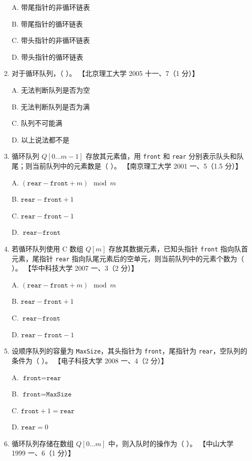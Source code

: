 \documentclass[lang=cn,newtx,10pt,scheme=chinese]{elegantbook}
\begin{document}
\begin{enumerate}
    A. 带尾指针的非循环链表  

    B. 带尾指针的循环链表  

    C. 带头指针的非循环链表  

    D. 带头指针的循环链表  

    \item 对于循环队列，（ ）。  
    【北京理工大学 2005 十一、7（1 分）】  

    A. 无法判断队列是否为空  

    B. 无法判断队列是否为满  

    C. 队列不可能满  

    D. 以上说法都不是  

    \item 循环队列 $Q[0 \ldots m-1]$ 存放其元素值，用 \texttt{front} 和 \texttt{rear} 分别表示队头和队尾；则当前队列中的元素数是（ ）。  
    【南京理工大学 2001 一、5（1.5 分）】  

    A. $(\texttt{rear} - \texttt{front} + m) \mod m$  

    B. $\texttt{rear} - \texttt{front} + 1$  

    C. $\texttt{rear} - \texttt{front} - 1$  

    D. $\texttt{rear} - \texttt{front}$  

    \item 若循环队列使用 C 数组 $Q[m]$ 存放其数据元素，已知头指针 \texttt{front} 指向队首元素，尾指针 \texttt{rear} 指向队尾元素后的空单元，则当前队列中的元素个数为（ ）。  
    【华中科技大学 2007 一、3（2 分）】 

    A. $(\texttt{rear} - \texttt{front} + m) \mod m$  

    B. $\texttt{rear} - \texttt{front} + 1$  

    C. $\texttt{rear} - \texttt{front}$  

    D. $\texttt{rear} - \texttt{front} - 1$  

    \item 设顺序队列的容量为 \texttt{MaxSize}，其头指针为 \texttt{front}，尾指针为 \texttt{rear}，空队列的条件为（ ）。  
    【电子科技大学 2008 一、4（2 分）】  

    A. $\texttt{front} = \texttt{rear}$  

    B. $\texttt{front} = \texttt{MaxSize}$  

    C. $\texttt{front} + 1 = \texttt{rear}$  

    D. $\texttt{rear} = 0$  

    \item 循环队列存储在数组 $Q[0 \ldots m]$ 中，则入队时的操作为（ ）。  
    【中山大学 1999 一、6（1 分）】  


\end{enumerate}
\end{document}
